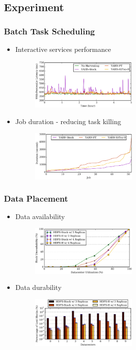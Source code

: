 \documentclass{beamer}
\begin{document}
\subsection{Experiment}
	\begin{frame}
	\frametitle{Batch Task Scheduling}
		\begin{itemize}
		\item Interactive services performance
			\begin{figure}[h!]
			\centering
			\includegraphics[width=0.5\textwidth]{./figure/experiment1.PNG}
			\end{figure}
		\item Job duration - reducing task killing
			\begin{figure}[h!]
			\centering
			\includegraphics[width=0.5\textwidth]{./figure/experiment2.PNG}
			\end{figure}
		\end{itemize}
	\end{frame}

	\begin{frame}
	\frametitle{Data Placement}
		\begin{itemize}
		\item Data availability
			\begin{figure}[h!]
			\centering
			\includegraphics[width=0.5\textwidth]{./figure/experiment3.PNG}
			\end{figure}
		\item Data durability
			\begin{figure}[h!]
			\centering
			\includegraphics[width=0.5\textwidth]{./figure/experiment4.PNG}
			\end{figure}
		\end{itemize}
	\end{frame}
\end{document}
